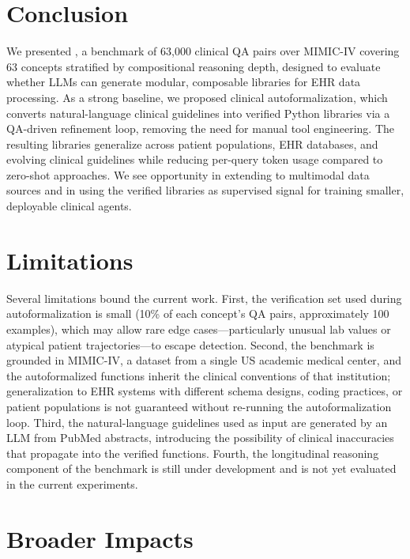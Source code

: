 \section*{Conclusion}

We presented \ours{}, a benchmark of 63{,}000 clinical QA pairs over MIMIC-IV covering 63 concepts stratified by compositional reasoning depth, designed to evaluate whether LLMs can generate modular, composable libraries for EHR data processing. As a strong baseline, we proposed clinical autoformalization, which converts natural-language clinical guidelines into verified Python libraries via a QA-driven refinement loop, removing the need for manual tool engineering. The resulting libraries generalize across patient populations, EHR databases, and evolving clinical guidelines while reducing per-query token usage compared to zero-shot approaches. We see opportunity in extending \ours{} to multimodal data sources and in using the verified libraries as supervised signal for training smaller, deployable clinical agents.

\section*{Limitations}

Several limitations bound the current work. First, the verification set used during autoformalization is small (10\% of each concept's QA pairs, approximately 100 examples), which may allow rare edge cases---particularly unusual lab values or atypical patient trajectories---to escape detection. Second, the benchmark is grounded in MIMIC-IV, a dataset from a single US academic medical center, and the autoformalized functions inherit the clinical conventions of that institution; generalization to EHR systems with different schema designs, coding practices, or patient populations is not guaranteed without re-running the autoformalization loop. Third, the natural-language guidelines used as input are generated by an LLM from PubMed abstracts, introducing the possibility of clinical inaccuracies that propagate into the verified functions. Fourth, the longitudinal reasoning component of the benchmark is still under development and is not yet evaluated in the current experiments.

\section*{Broader Impacts}

